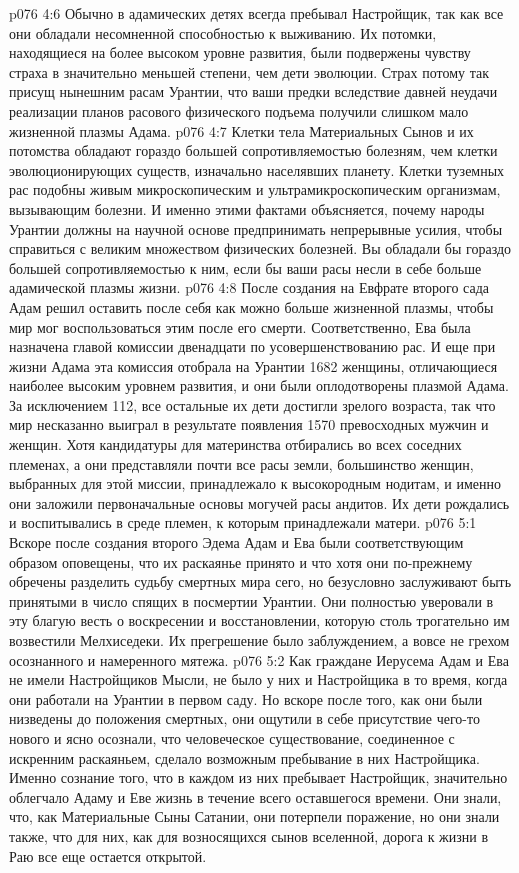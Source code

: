 \vs p076 4:6 Обычно в адамических детях всегда пребывал Настройщик, так как все они обладали несомненной способностью к выживанию. Их потомки, находящиеся на более высоком уровне развития, были подвержены чувству страха в значительно меньшей степени, чем дети эволюции. Страх потому так присущ нынешним расам Урантии, что ваши предки вследствие давней неудачи реализации планов расового физического подъема получили слишком мало жизненной плазмы Адама.
\vs p076 4:7 Клетки тела Материальных Сынов и их потомства обладают гораздо большей сопротивляемостью болезням, чем клетки эволюционирующих существ, изначально населявших планету. Клетки туземных рас подобны живым микроскопическим и ультрамикроскопическим организмам, вызывающим болезни. И именно этими фактами объясняется, почему народы Урантии должны на научной основе предпринимать непрерывные усилия, чтобы справиться с великим множеством физических болезней. Вы обладали бы гораздо большей сопротивляемостью к ним, если бы ваши расы несли в себе больше адамической плазмы жизни.
\vs p076 4:8 \pc После создания на Евфрате второго сада Адам решил оставить после себя как можно больше жизненной плазмы, чтобы мир мог воспользоваться этим после его смерти. Соответственно, Ева была назначена главой комиссии двенадцати по усовершенствованию рас. И еще при жизни Адама эта комиссия отобрала на Урантии 1682 женщины, отличающиеся наиболее высоким уровнем развития, и они были оплодотворены плазмой Адама. За исключением 112, все остальные их дети достигли зрелого возраста, так что мир несказанно выиграл в результате появления 1570 превосходных мужчин и женщин. Хотя кандидатуры для материнства отбирались во всех соседних племенах, а они представляли почти все расы земли, большинство женщин, выбранных для этой миссии, принадлежало к высокородным нодитам, и именно они заложили первоначальные основы могучей расы андитов. Их дети рождались и воспитывались в среде племен, к которым принадлежали матери.
\vs p076 5:1 Вскоре после создания второго Эдема Адам и Ева были соответствующим образом оповещены, что их раскаянье принято и что хотя они по\hyp{}прежнему обречены разделить судьбу смертных мира сего, но безусловно заслуживают быть принятыми в число спящих в посмертии Урантии. Они полностью уверовали в эту благую весть о воскресении и восстановлении, которую столь трогательно им возвестили Мелхиседеки. Их прегрешение было заблуждением, а вовсе не грехом осознанного и намеренного мятежа.
\vs p076 5:2 Как граждане Иерусема Адам и Ева не имели Настройщиков Мысли, не было у них и Настройщика в то время, когда они работали на Урантии в первом саду. Но вскоре после того, как они были низведены до положения смертных, они ощутили в себе присутствие чего\hyp{}то нового и ясно осознали, что человеческое существование, соединенное с искренним раскаяньем, сделало возможным пребывание в них Настройщика. Именно сознание того, что в каждом из них пребывает Настройщик, значительно облегчало Адаму и Еве жизнь в течение всего оставшегося времени. Они знали, что, как Материальные Сыны Сатании, они потерпели поражение, но они знали также, что для них, как для возносящихся сынов вселенной, дорога к жизни в Раю все еще остается открытой.
